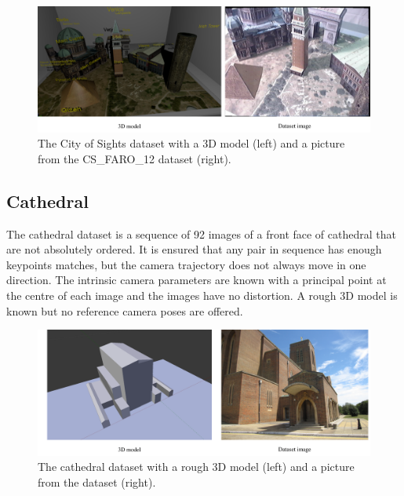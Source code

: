 \begin{figure}[ht]
	\begin{center}
		\includegraphics[keepaspectratio,width=\textwidth]{fig/experiments-city-of-sights.pdf}
	\end{center}
	\caption{The City of Sights dataset with a 3D model (left) and a picture from the CS\_FARO\_12 dataset (right).}
	\label{fig:cityofsights}
\end{figure}

\subsection*{Cathedral}
The cathedral dataset is a sequence of 92 images of a front face of cathedral that are not absolutely ordered. It is ensured that any pair in sequence has enough keypoints matches, but the camera trajectory does not always move in one direction. The intrinsic camera parameters are known with a principal point at the centre of each image and the images have no distortion. A rough 3D model is known but no reference camera poses are offered.

\begin{figure}[ht]
	\begin{center}
		\includegraphics[keepaspectratio,width=\textwidth]{fig/experiments-cathedral.pdf}
	\end{center}
	\caption{The cathedral dataset with a rough 3D model (left) and a picture from the dataset (right).}
	\label{fig:cathedral}
\end{figure}

